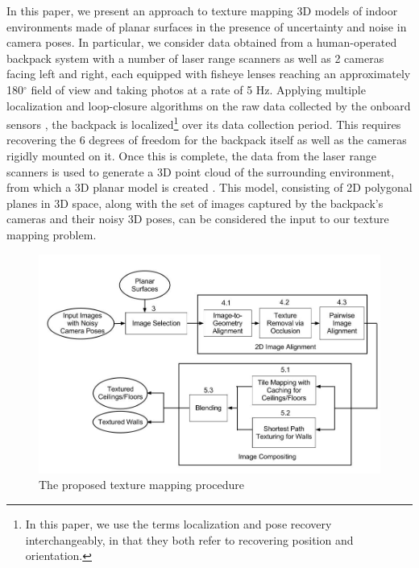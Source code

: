 \documentclass[]{spie}  %
\begin{document}
In this paper, we present an approach to texture mapping 3D models of
indoor environments made of planar surfaces in the presence of
uncertainty and noise in camera poses. In particular, we consider data
obtained from a human-operated backpack system with a number of laser
range scanners as well as 2 cameras facing left and right, each
equipped with fisheye lenses reaching an approximately 180$^{\circ}$
field of view and taking photos at a rate of 5 Hz. Applying multiple
localization and loop-closure algorithms on the raw data collected by
the onboard sensors \cite{chen2010indoor, kua2012loopclosure,
  liu2010indoor}, the backpack is localized\footnote{In this paper, we
  use the terms localization and pose recovery interchangeably, in
  that they both refer to recovering position and orientation.}  over
its data collection period. This requires recovering the 6 degrees of
freedom for the backpack itself as well as the cameras rigidly mounted
on it. Once this is complete, the data from the laser range scanners
is used to generate a 3D point cloud of the surrounding environment,
from which a 3D planar model is created \cite{sanchez2012point}. This
model, consisting of 2D polygonal planes in 3D space, along with the
set of images captured by the backpack's cameras and their noisy 3D
poses, can be considered the input to our texture mapping problem.

\begin{figure}
  \centering
  \includegraphics[trim=0cm 3cm 0cm 0cm, clip=true,
  width=6in]{flowchart.jpg}
  \caption{The proposed texture mapping procedure\\}
  \label{fig:flowchart}
\end{figure}
\end{document}
